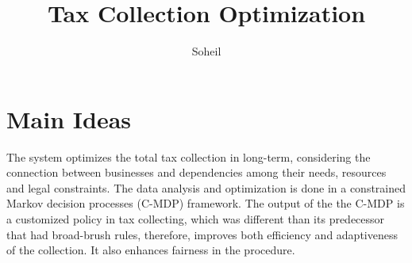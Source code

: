 \documentclass{article}
\title{Tax Collection Optimization}
\author{Soheil}
\date{}
\theoremstyle{remark}
\theoremstyle{remark}
\theoremstyle{remark}
\theoremstyle{remark}
\theoremstyle{remark}
\theoremstyle{remark}
\begin{document}
\maketitle
\section{Main Ideas}
 The system optimizes the total tax collection in long-term, considering the connection between businesses and dependencies among their needs, resources and legal constraints. The data analysis and optimization is done in a constrained Markov decision processes (C-MDP) framework. The output of the the C-MDP is a customized policy in tax collecting, which was different than its predecessor that had broad-brush rules, therefore, improves both efficiency and adaptiveness of the collection. It also enhances fairness in the procedure.
\end{document}
